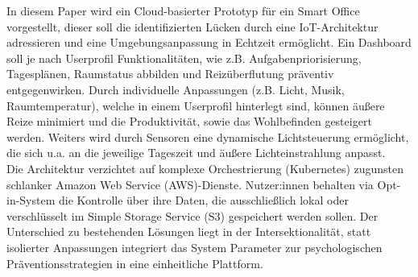 In diesem Paper wird ein Cloud-basierter Prototyp für ein Smart Office vorgestellt, dieser 
soll die identifizierten Lücken durch eine IoT-Architektur adressieren und eine Umgebungsanpassung 
in Echtzeit ermöglicht. 
Ein Dashboard soll je nach Userprofil Funktionalitäten, wie z.B. Aufgabenpriorisierung,
Tagesplänen, Raumstatus abbilden und Reizüberflutung präventiv entgegenwirken.
Durch individuelle Anpassungen (z.B. Licht, Musik, Raumtemperatur), welche in einem Userprofil
hinterlegt sind, können äußere Reize minimiert und die Produktivität, sowie das 
Wohlbefinden gesteigert werden. Weiters wird durch Sensoren eine dynamische Lichtsteuerung
ermöglicht, die sich u.a. an die jeweilige Tageszeit und äußere Lichteinstrahlung anpasst.\\
Die Architektur verzichtet auf komplexe Orchestrierung (Kubernetes) zugunsten 
schlanker Amazon Web Service (AWS)-Dienste. Nutzer:innen behalten via Opt-in-System die 
Kontrolle über ihre Daten, die ausschließlich lokal oder verschlüsselt im Simple Storage Service (S3) 
gespeichert werden sollen. Der Unterschied zu bestehenden Lösungen liegt in der 
Intersektionalität, statt isolierter Anpassungen integriert das System Parameter 
zur psychologischen Präventionsstrategien in eine einheitliche Plattform. \\

	

	
